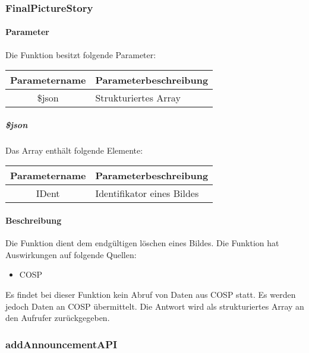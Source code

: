 \subsubsection{FinalPictureStory}
\paragraph{Parameter} Die Funktion besitzt folgende Parameter:
\begin{table}[H]
	\begin{tabular}{|c|p{11cm}|}
		\hline
		\textbf{Parametername} & \textbf{Parameterbeschreibung} \\ \hline
		\$json & Strukturiertes Array \\ \hline
	\end{tabular}
\end{table}
\subparagraph{\$json}Das Array enthält folgende Elemente:
\begin{table}[H]
	\begin{tabular}{|c|p{11cm}|}
		\hline
		\textbf{Parametername} & \textbf{Parameterbeschreibung} \\ \hline
		IDent & Identifikator eines Bildes \\ \hline
	\end{tabular}
\end{table}
\paragraph{Beschreibung} Die Funktion dient dem endgültigen löschen eines Bildes. Die Funktion hat Auswirkungen auf folgende Quellen:
\begin{itemize}
	\item COSP
\end{itemize}
Es findet bei dieser Funktion kein Abruf von Daten aus {\glqq COSP\grqq} statt. Es werden jedoch Daten an {\glqq COSP\grqq} übermittelt. Die Antwort wird als strukturiertes Array an den Aufrufer zurückgegeben.
\subsubsection{addAnnouncementAPI}
